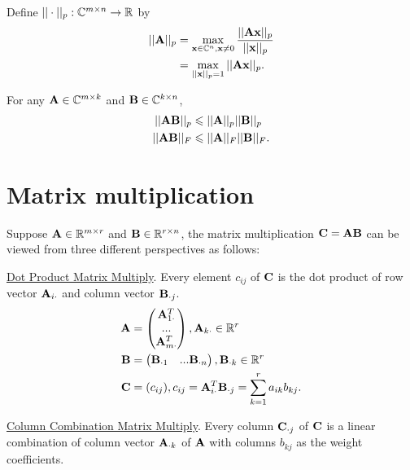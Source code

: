 \begin{definition}{}{}
    Define $||\cdot||_p:\mathbb{C}^{m\times n}\rightarrow \mathbb{R}$ by
    \begin{align*}
        ||\bold{A}||_{p}&=\max_{\bold{x}\in\mathbb{C}^n,\bold{x}\neq 0}\frac{||\bold{A\bold{x}}||_{p}}{||\bold{x}||_p}\\
                            &=\max_{||\bold{x}||_p=1}||\bold{A}\bold{x}||_{p}.
    \end{align*}
\end{definition}


\begin{proposition}{}{}
    For any $\bold{A}\in \mathbb{C}^{m\times k}$ and $\bold{B}\in\mathbb{C}^{k\times n}$, 
    \begin{align*}
        ||\bold{A}\bold{B}||_p&\leqslant ||\bold{A}||_p||\bold{B}||_p\\
        ||\bold{A}\bold{B}||_F&\leqslant ||\bold{A}||_F||\bold{B}||_F.
    \end{align*}
\end{proposition}

\section{Matrix multiplication}
Suppose $\bold{A}\in\mathbb{R}^{m\times r}$ and $\bold{B}\in \mathbb{R}^{r\times n}$,
the matrix multiplication $\bold{C}=\bold{A}\bold{B}$ can be viewed from
three different perspectives as follows:
\par
\underline{Dot Product Matrix Multiply}. 
Every element $c_{ij}$ of $\bold{C}$ is the 
dot product of row vector $\bold{A}_{i\cdot}$ and column vector $\bold{B}_{\cdot j}$.
\begin{align*}
    \bold{A}&=\begin{pmatrix}
        \bold{A}_{1\cdot}^T\\ ...\\\bold{A}_{m\cdot}^T
    \end{pmatrix},\bold{A}_{k\cdot}\in\mathbb{R}^r\\
    \bold{B}&=\begin{pmatrix}
        \bold{B}_{\cdot 1}&...\bold{B}_{\cdot n}
    \end{pmatrix},\bold{B}_{\cdot k}\in\mathbb{R}^r\\
    \bold{C}&=(c_{ij}),c_{ij}=\bold{A}_{i\cdot}^T\bold{B}_{\cdot j}=\sum\limits_{k=1}^{r}a_{ik}b_{kj}.
\end{align*}
\par
\underline{Column Combination Matrix Multiply}.
Every column $\bold{C}_{\cdot j}$ of $\bold{C}$ is a linear combination of column vector
$\bold{A}_{\cdot k}$ of $\bold{A}$ with columns $b_{kj}$ as the weight coefficients.






